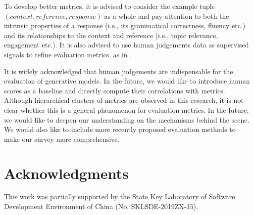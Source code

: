 \documentclass[conference]{IEEEtran}
\begin{document}
To develop better metrics, it is advised to consider the example tuple $(context, reference, response)$
as a whole and pay attention to both the intrinsic properties of a response (i.e., its grammatical correctness, fluency etc.) and its relationships to the context and reference (i.e., topic relevance, engagement etc.). It is also advised to use human judgements data as supervised signals to refine evaluation metrics, as in \cite{ADEM}.

It is widely acknowledged that human judgements are indispensable for the evaluation of generative models.
In the future, we would like to introduce human scores as a baseline and directly compute their correlations with metrics.
Although hierarchical clusters of metrics are observed in this research, it is not clear whether this is a general phenomenon for evaluation metrics.
In the future, we would like to deepen our understanding on the mechanisms behind the scene.
We would also like to include more recently proposed evaluation methods to make our survey more comprehensive.

\section*{Acknowledgments}
This work was partially supported by the State Key Laboratory of Software Development Environment of China (No. SKLSDE-2019ZX-15).



%
%
%
\balance




\end{document}
